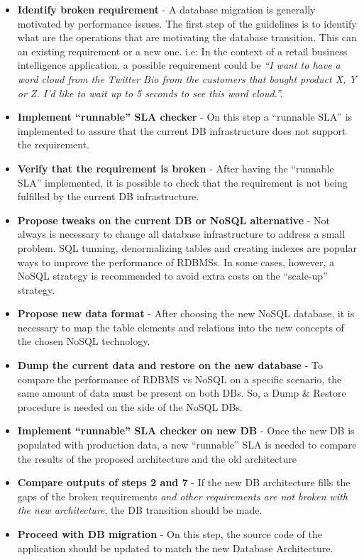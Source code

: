 \begin{itemize}
   \item{\textbf{Identify broken requirement} - A database migration is generally motivated by performance issues. The first step of the guidelines is to identify what are the operations that are motivating the database transition. This can an existing requirement or a new one. i.e: In the context of a retail business intelligence application, a possible requirement could be \textit{``I want to have a word cloud from the Twitter Bio from the customers that bought product X, Y or Z. I'd like to wait up to 5 seconds to see this word cloud.''.}}
   \item{\textbf{Implement ``runnable'' SLA checker} - On this step a ``runnable SLA'' is implemented to assure that the current DB infrastructure does not support the requirement. }
   \item{\textbf{Verify that the requirement is broken} - After having the ``runnable SLA'' implemented, it is possible to check that the requirement is not being fulfilled by the current DB infrastructure.}
   \item{\textbf{Propose tweaks on the current DB or NoSQL alternative} - Not always is necessary to change all database infrastructure to address a small problem. SQL tunning, denormalizing tables and creating indexes are popular ways to improve the performance of RDBMSs. In some cases, however, a NoSQL strategy is recommended to avoid extra costs on the ``scale-up'' strategy.}
   \item{\textbf{Propose new data format} - After choosing the new NoSQL database, it is necessary to map the table elements and relations into the new concepts of the chosen NoSQL technology.}
   \item{\textbf{Dump the current data and restore on the new database} - To compare the performance of RDBMS vs NoSQL on a specific scenario, the same amount of data must be present on both DBs. So, a Dump \& Restore procedure is needed on the side of the NoSQL DBs.}
   \item{\textbf{Implement ``runnable'' SLA checker on new DB} - Once the new DB is populated with production data, a new ``runnable'' SLA is needed to compare the results of the proposed architecture and the old architecture}
   \item{\textbf{Compare outputs of steps 2 and 7} - If the new DB architecture fills the gaps of the broken requirements \textit{ and other requirements are not broken with the new architecture}, the DB transition should be made.}
   \item{\textbf{Proceed with DB migration} - On this step, the source code of the application should be updated to match the new Database Architecture. }
\end{itemize}

